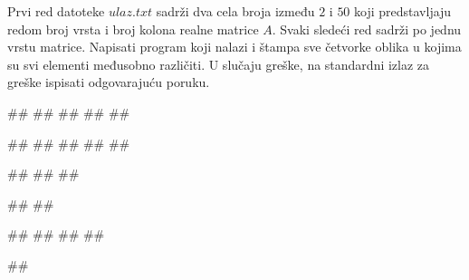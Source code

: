 \begin{Exercise}[label=p3_x6]         
Prvi red datoteke $ulaz.txt$ sadrži dva cela broja između $2$ i $50$
koji predstavljaju redom broj vrsta i broj kolona realne matrice
$A$. Svaki sledeći red sadrži po jednu vrstu matrice. Napisati
program koji nalazi i štampa sve četvorke oblika
 u kojima su svi
elementi međusobno različiti.
U slučaju greške, na standardni izlaz za greške ispisati odgovarajuću poruku.

\begin{minitest}
\begin{upotreba}{1}
##
##
##
##
##

#\naslovIzlaz#
##
##
##
##
\end{upotreba}
\end{minitest}
\begin{minitest}
\begin{upotreba}{2}
##
##
##

#\naslovIzlazZaGresku#
##
\end{upotreba}
\end{minitest}
\begin{minitest}
\begin{upotreba}{3}
##
##
##
##

#\naslovIzlaz#
\end{upotreba}
\end{minitest}
\end{Exercise}
\begin{Answer}[ref=p3_x6]
\end{Answer}





